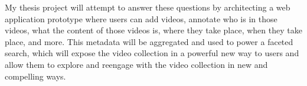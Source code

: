 My thesis project will attempt to answer these questions by architecting a web application prototype where users can add videos, annotate who is in those videos, what the content of those videos is, where they take place, when they take place, and more.  This metadata will be aggregated and used to power a faceted search, which will expose the video collection in a powerful new way to users and allow them to explore and reengage with the video collection in new and compelling ways.


%
%
%
%
%
%
%
%
%
%


